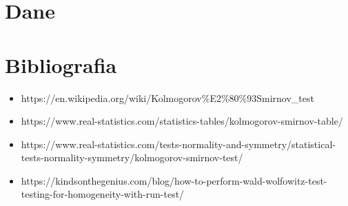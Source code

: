 \documentclass{article}
\begin{document}
\newpage
\section{Dane}

\begin{center}
\tiny
{}
\end{center}

\newpage
\begin{center}
\tiny
{}
\end{center}

\newpage
\section{Bibliografia}
\begin{itemize}
\item https://en.wikipedia.org/wiki/Kolmogorov\%E2\%80\%93Smirnov\_test
\item https://www.real-statistics.com/statistics-tables/kolmogorov-smirnov-table/
\item https://www.real-statistics.com/tests-normality-and-symmetry/statistical-tests-normality-symmetry/kolmogorov-smirnov-test/
\item https://kindsonthegenius.com/blog/how-to-perform-wald-wolfowitz-test-testing-for-homogeneity-with-run-test/
\end{itemize}
\end{document}
